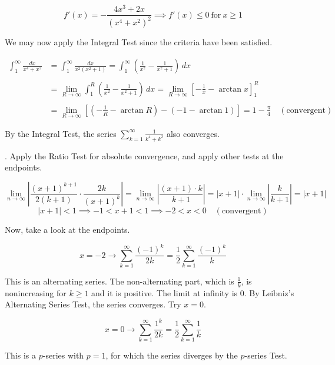 \documentclass{article}
\begin{document}
\[f'(x)=-\frac{4x^3+2x}{\left(x^4+x^2\right)^2}\implies f'(x)\leq0\:\text{for}\:x\geq1\]

\hfill

\noindent We may now apply the Integral Test since the criteria have been satisfied.

\begin{align*}\int_1^{\infty}\frac{dx}{x^4+x^2}&=\int_1^{\infty}\frac{dx}{x^2\left(x^2+1\right)}=\int_1^{\infty}\left(\frac1{x^2}-\frac1{x^2+1}\right)\,dx\\\\&=\lim_{R\to\infty}\int_1^R\left(\frac1{x^2}-\frac1{x^2+1}\right)\,dx=\lim_{R\to\infty}\left[-\frac1x-\arctan x\right]_1^R\\\\&=\lim_{R\to\infty}\left[\left(-\frac1R-\arctan R\right)-\left(-1-\arctan1\right)\right]=1-\frac\pi4\quad\left(\text{convergent}\right)\end{align*}

\hfill

\noindent By the Integral Test, the series $\displaystyle\sum_{k=1}^{\infty}\frac1{k^4+k^2}$ also converges.

\hfill

. Apply the Ratio Test for absolute convergence, and apply other tests at the endpoints.

\[\lim_{n\to\infty}\left|\frac{(x+1)^{k+1}}{2(k+1)}\cdot\frac{2k}{(x+1)^k}\right|=\lim_{n\to\infty}\left|\frac{(x+1)\cdot k}{k+1}\right|=|x+1|\cdot\lim_{n\to\infty}\left|\frac{k}{k+1}\right|=|x+1|\]
\[|x+1|<1\implies-1<x+1<1\implies-2<x<0\quad(\text{convergent})\]

\hfill

\noindent Now, take a look at the endpoints.

\[x=-2\rightarrow\sum_{k=1}^{\infty}\frac{(-1)^k}{2k}=\frac12\sum_{k=1}^{\infty}\frac{(-1)^k}k\]

\hfill

\noindent This is an alternating series. The non-alternating part, which is $\frac1k$, is nonincreasing for $k\geq1$ and it is positive. The limit at infinity is $0$. By Leibniz's Alternating Series Test, the series converges. Try $x=0$.

\[x=0\rightarrow\sum_{k=1}^{\infty}\frac{1^k}{2k}=\frac12\sum_{k=1}^{\infty}\frac1k\]

\hfill

\noindent This is a $p$-series with $p=1$, for which the series diverges by the $p$-series Test.
\end{document}

